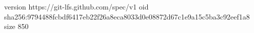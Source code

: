 version https://git-lfs.github.com/spec/v1
oid sha256:9794488fcbdf6417eb22f26a8eca8033d0e08872d67c1e9a15c5ba3c92eef1a8
size 850
